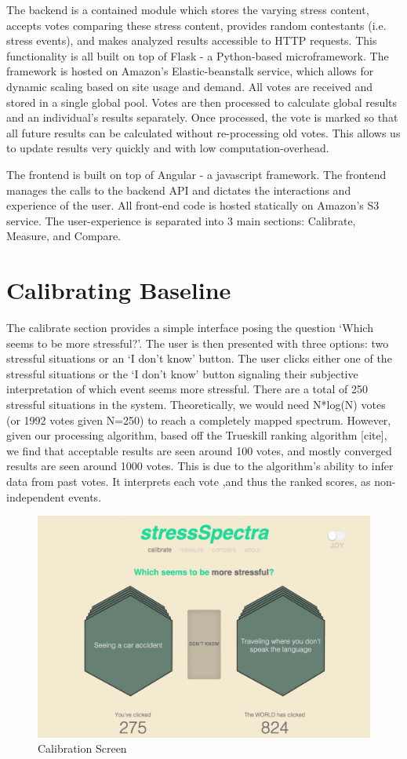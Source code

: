 \documentclass{sigchi}
\begin{document}
The backend is a contained module which stores the varying stress content, accepts votes comparing these stress content, provides random contestants (i.e. stress events), and makes analyzed results accessible to HTTP requests. This functionality is all built on top of Flask \cite{flask} - a Python-based microframework. The framework is hosted on Amazon’s Elastic-beanstalk service, which allows for dynamic scaling based on site usage and demand. All votes are received and stored in a single global pool. Votes are then processed to calculate global results and an individual’s results separately. Once processed, the vote is marked so that all future results can be calculated without re-processing old votes. This allows us to update results very quickly and with low computation-overhead. 

The frontend is built on top of Angular \cite{angular} - a javascript framework. The frontend manages the calls to the backend API and dictates the interactions and experience of the user. All front-end code is hosted statically on Amazon’s S3 service. The user-experience is separated into 3 main sections: Calibrate, Measure, and Compare. 


\section{Calibrating Baseline}
The calibrate section provides a simple interface posing the question ‘Which seems to be more stressful?’. The user is then presented with three options: two stressful situations or an ‘I don’t know’ button. The user clicks either one of the stressful situations or the ‘I don’t know’ button signaling their subjective interpretation of which event seems more stressful. There are a total of 250 stressful situations in the system. Theoretically, we would need N*log(N) votes (or 1992 votes given N=250) to reach a completely mapped spectrum. However, given our processing algorithm, based off the Trueskill ranking algorithm [cite], we find that acceptable results are seen around 100 votes, and mostly converged results are seen around 1000 votes. This is due to the algorithm’s ability to infer data from past votes. It interprets each vote ,and thus the ranked scores, as non-independent events.
\begin{figure}[!h]
\centering
\includegraphics[width=0.9\columnwidth]{calibrate}
\caption{Calibration Screen}
\label{fig:calibrate}
\end{figure}
\end{document}
